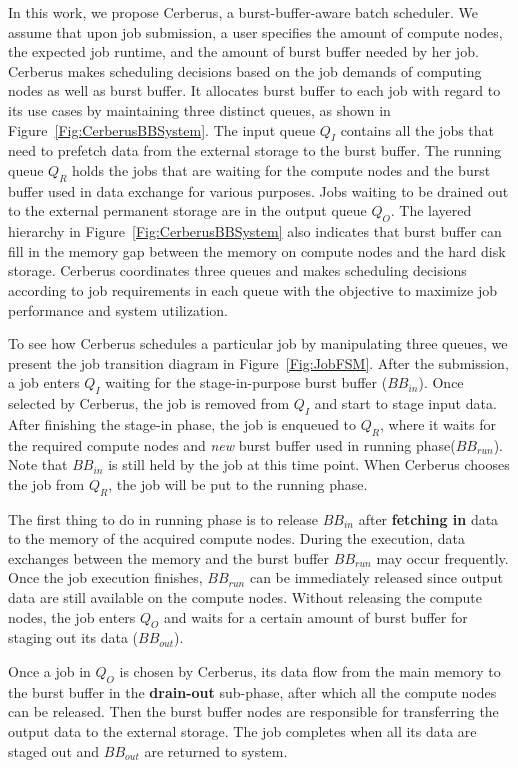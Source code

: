 In this work,
we propose Cerberus, a burst-buffer-aware batch scheduler.
We assume that upon job submission, a user specifies the amount of compute nodes, 
the expected job runtime, and the amount of burst buffer needed by her job.
Cerberus makes scheduling decisions based on the job demands of computing nodes as well as burst buffer.
It allocates burst buffer to each job with regard to its use cases
by maintaining three distinct queues, as shown in Figure~\ref{Fig:CerberusBBSystem}.
The input queue $Q_I$ contains all the jobs that need to prefetch data
from the external storage to the burst buffer.
The running queue $Q_R$ holds the jobs that are waiting for the compute nodes and
the burst buffer used in data exchange for various purposes.
Jobs waiting to be drained out to the external permanent storage are in the output queue $Q_O$.
The layered hierarchy in Figure~\ref{Fig:CerberusBBSystem} also indicates that burst buffer
can fill in the memory gap between the memory on compute nodes and the hard disk storage.
Cerberus coordinates three queues and makes scheduling decisions according to job requirements
in each queue with the objective to maximize job performance and system utilization.

To see how Cerberus schedules a particular job by manipulating three queues,
we present the job transition diagram in Figure~\ref{Fig:JobFSM}.
After the submission, a job enters $Q_I$ waiting for the stage-in-purpose burst buffer ($BB_{in}$).
Once selected by Cerberus, the job is removed from $Q_I$ and start to stage input data.
After finishing the stage-in phase, the job is enqueued to $Q_R$,
where it waits for the required compute nodes and \textit{new} burst buffer used in running phase($BB_{run}$).
Note that $BB_{in}$ is still held by the job at this time point.
When Cerberus chooses the job from $Q_R$, the job will be put to the running phase.

The first thing to do in running phase is to release $BB_{in}$ after
\textbf{fetching in} data to the memory of the acquired compute nodes.
During the execution, data exchanges between the memory and the burst buffer $BB_{run}$
may occur frequently.
Once the job execution finishes, $BB_{run}$ can be immediately released since
output data are still available on the compute nodes.
Without releasing the compute nodes, the job enters $Q_O$ and waits for a certain amount of burst buffer for staging out its data ($BB_{out}$).

Once a job in $Q_O$ is chosen by Cerberus, its data flow from the main memory to the burst buffer
in the \textbf{drain-out} sub-phase, after which all the compute nodes can be released.
Then the burst buffer nodes are responsible for transferring the output data to the external storage.
The job completes when all its data are staged out and $BB_{out}$ are returned to system.

